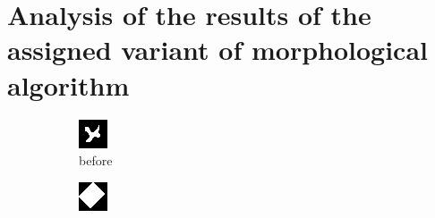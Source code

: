 \documentclass[12pt]{article}
\begin{document}
\section{Analysis of the results of the assigned variant of morphological algorithm}

\begin{figure}[H]\centering
    \begin{subfigure}[t]{\subfiguresize}
        \includegraphics[width=\textwidth]{img/image1.png}
        \caption{before}
    \end{subfigure}
    \hspace{2em}
    \begin{subfigure}[t]{\subfiguresize}
        \includegraphics[width=\textwidth]{img/image1-convexhull.png}

\end{subfigure}
\end{figure}
\end{document}
